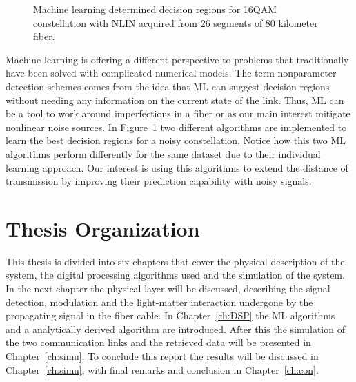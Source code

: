 \begin{figure}[h!]
 \centering
{}
  \qquad
 \caption{Machine learning determined decision regions for  16QAM constellation with NLIN acquired from 26 segments of 80 kilometer fiber.  }
 \label{fig:MLcons}
\end{figure}

Machine learning is offering a different perspective to problems that traditionally have been solved with complicated numerical models. The term nonparameter detection schemes comes from the idea that ML can suggest decision regions without needing any information on the current state of the link. Thus, ML can be a tool to work around imperfections in a fiber or as our main interest mitigate nonlinear noise sources. In Figure~\ref{fig:MLcons} two different algorithms are implemented to learn the best decision regions for a noisy constellation. Notice how this two ML algorithms perform differently for the same dataset due to their individual learning approach. Our interest is using this algorithms to extend the distance of transmission by improving their prediction capability with noisy signals.   





 



\section{Thesis Organization}

This thesis is divided into six chapters that cover the physical description of the system, the digital processing algorithms used and the simulation of the system. In the next chapter the physical layer will be discussed, describing the signal detection, modulation  and the light-matter interaction undergone by the propagating signal in the fiber cable. In Chapter~\ref{ch:DSP} the ML algorithms and a analytically derived algorithm are introduced. After this the simulation of the two communication links and the retrieved data will be presented in Chapter~\ref{ch:simu}. To conclude this report the results will be discussed in Chapter~\ref{ch:simu}, with final remarks and conclusion in Chapter~\ref{ch:con}.  


